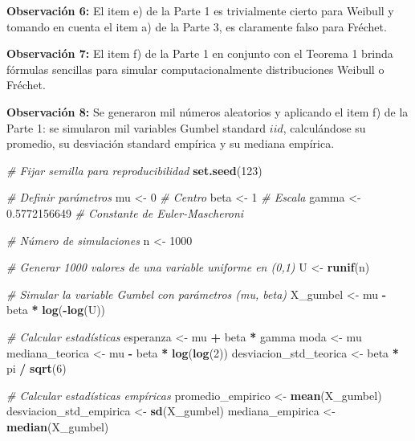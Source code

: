 \documentclass[
  20pt,
]{book}
\newenvironment{Shaded}{\begin{snugshade}}{\end{snugshade}}
\newcommand{\CommentTok}[1]{\textcolor[rgb]{0.56,0.35,0.01}{\textit{#1}}}
\newcommand{\DecValTok}[1]{\textcolor[rgb]{0.00,0.00,0.81}{#1}}
\newcommand{\FloatTok}[1]{\textcolor[rgb]{0.00,0.00,0.81}{#1}}
\newcommand{\FunctionTok}[1]{\textcolor[rgb]{0.13,0.29,0.53}{\textbf{#1}}}
\newcommand{\NormalTok}[1]{#1}
\newcommand{\OtherTok}[1]{\textcolor[rgb]{0.56,0.35,0.01}{#1}}
\newcommand{\SpecialCharTok}[1]{\textcolor[rgb]{0.81,0.36,0.00}{\textbf{#1}}}
\theoremstyle{definition}
\theoremstyle{definition}
\theoremstyle{definition}
\theoremstyle{definition}
\theoremstyle{remark}
\begin{document}
\textbf{Observación 6:} El item e) de la Parte 1 es
trivialmente cierto para Weibull y tomando en
cuenta el item a) de la Parte 3, es claramente falso
para Fréchet.

\textbf{Observación 7:} El item f) de la Parte 1 en
conjunto con el Teorema 1 brinda fórmulas
sencillas para simular computacionalmente
distribuciones Weibull o Fréchet.

\textbf{Observación 8:} Se generaron mil números aleatorios y aplicando el
item f) de la Parte 1: se simularon mil variables
Gumbel standard \(iid\), calculándose su promedio, su
desviación standard empírica y su mediana
empírica.

\begin{Shaded}
\begin{Highlighting}[]
\CommentTok{\# Fijar semilla para reproducibilidad}
\FunctionTok{set.seed}\NormalTok{(}\DecValTok{123}\NormalTok{)}

\CommentTok{\# Definir parámetros}
\NormalTok{mu }\OtherTok{\textless{}{-}} \DecValTok{0}       \CommentTok{\# Centro}
\NormalTok{beta }\OtherTok{\textless{}{-}} \DecValTok{1}     \CommentTok{\# Escala}
\NormalTok{gamma }\OtherTok{\textless{}{-}} \FloatTok{0.5772156649}  \CommentTok{\# Constante de Euler{-}Mascheroni}

\CommentTok{\# Número de simulaciones}
\NormalTok{n }\OtherTok{\textless{}{-}} \DecValTok{1000}

\CommentTok{\# Generar 1000 valores de una variable uniforme en (0,1)}
\NormalTok{U }\OtherTok{\textless{}{-}} \FunctionTok{runif}\NormalTok{(n)}

\CommentTok{\# Simular la variable Gumbel con parámetros (mu, beta)}
\NormalTok{X\_gumbel }\OtherTok{\textless{}{-}}\NormalTok{ mu }\SpecialCharTok{{-}}\NormalTok{ beta }\SpecialCharTok{*} \FunctionTok{log}\NormalTok{(}\SpecialCharTok{{-}}\FunctionTok{log}\NormalTok{(U))}

\CommentTok{\# Calcular estadísticas}
\NormalTok{esperanza }\OtherTok{\textless{}{-}}\NormalTok{ mu }\SpecialCharTok{+}\NormalTok{ beta }\SpecialCharTok{*}\NormalTok{ gamma}
\NormalTok{moda }\OtherTok{\textless{}{-}}\NormalTok{ mu}
\NormalTok{mediana\_teorica }\OtherTok{\textless{}{-}}\NormalTok{ mu }\SpecialCharTok{{-}}\NormalTok{ beta }\SpecialCharTok{*} \FunctionTok{log}\NormalTok{(}\FunctionTok{log}\NormalTok{(}\DecValTok{2}\NormalTok{))}
\NormalTok{desviacion\_std\_teorica }\OtherTok{\textless{}{-}}\NormalTok{ beta }\SpecialCharTok{*}\NormalTok{ pi }\SpecialCharTok{/} \FunctionTok{sqrt}\NormalTok{(}\DecValTok{6}\NormalTok{)}

\CommentTok{\# Calcular estadísticas empíricas}
\NormalTok{promedio\_empirico }\OtherTok{\textless{}{-}} \FunctionTok{mean}\NormalTok{(X\_gumbel)}
\NormalTok{desviacion\_std\_empirica }\OtherTok{\textless{}{-}} \FunctionTok{sd}\NormalTok{(X\_gumbel)}
\NormalTok{mediana\_empirica }\OtherTok{\textless{}{-}} \FunctionTok{median}\NormalTok{(X\_gumbel)}
\end{Highlighting}
\end{Shaded}
\end{document}

